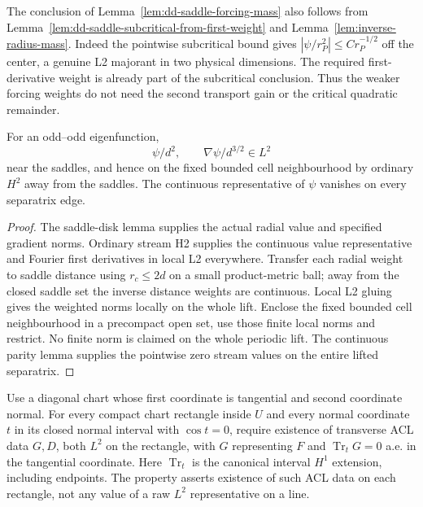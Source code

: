 \begin{remark}
The conclusion of Lemma~\ref{lem:dd-saddle-forcing-mass} also follows from
Lemma~\ref{lem:dd-saddle-subcritical-from-first-weight} and
Lemma~\ref{lem:inverse-radius-mass}. Indeed the pointwise subcritical bound gives
$|\psi/r_P^2|\le Cr_P^{-1/2}$ off the center, a genuine L2 majorant in two
physical dimensions. The required first-derivative weight is already part of
the subcritical conclusion. Thus the weaker forcing weights do not need the
second transport gain or the critical quadratic remainder.
\end{remark}

\begin{lemma}
\label{lem:dd-weighted-forcing}
\leanok
For an odd--odd eigenfunction,
\[
 \psi/d^2,\qquad \nabla\psi/d^{3/2}\in L^2
\]
near the saddles, and hence on the fixed bounded cell neighbourhood by
ordinary $H^2$ away from the saddles. The continuous representative of $\psi$
vanishes on every separatrix edge.
\end{lemma}

\begin{proof}
\leanok
The saddle-disk lemma supplies the actual radial value and specified gradient
norms. Ordinary stream H2 supplies the continuous value representative and
Fourier first derivatives in local L2 everywhere.
Transfer each radial weight to saddle distance using $r_c\le2d$ on a
small product-metric ball; away from the closed saddle set the inverse
distance weights are continuous. Local L2 gluing gives the weighted norms
locally on the whole lift.
Enclose the fixed bounded cell neighbourhood in a precompact open set,
use those finite local norms and restrict. No finite norm is claimed on
the whole periodic lift. The continuous parity lemma supplies the
pointwise zero stream values on the entire lifted separatrix.
\end{proof}

\begin{definition}
\label{def:zero-separatrix-trace}
\leanok
Use a diagonal chart whose first coordinate is tangential and second
coordinate normal. For every compact chart rectangle inside $U$ and every
normal coordinate $t$ in its closed normal interval with $\cos t=0$,
require existence of transverse ACL data $G,D$, both $L^2$ on the rectangle,
with $G$ representing $F$ and
$\operatorname{Tr}_tG=0$ a.e. in the tangential coordinate.
Here $\operatorname{Tr}_t$ is the canonical interval $H^1$ extension,
including endpoints. The property asserts existence of such ACL data on
each rectangle, not any value of a raw $L^2$ representative on a line.
\end{definition}

